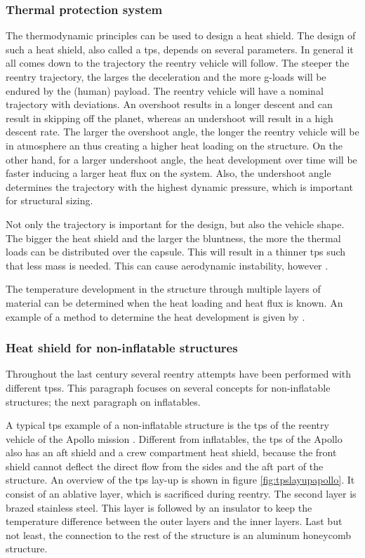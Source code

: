 \subsubsection{Thermal protection system}
The thermodynamic principles can be used to design a heat shield. The design of such a heat shield, also called a \acrfull{tps}, depends on several parameters. In general it all comes down to the trajectory the reentry vehicle will follow. The steeper the reentry trajectory, the larges the deceleration and the more g-loads will be endured by the (human) payload. The reentry vehicle will have a nominal trajectory with deviations. An overshoot results in a longer descent and can result in skipping off the planet, whereas an undershoot will result in a high descent rate. The larger the overshoot angle, the longer the reentry vehicle will be in atmosphere an thus creating a higher heat loading on the structure. On the other hand, for a larger undershoot angle, the heat development over time will be faster inducing a larger heat flux on the system. Also, the undershoot angle determines the trajectory with the highest dynamic pressure, which is important for structural sizing. 

Not only the trajectory is important for the design, but also the vehicle shape. The bigger the heat shield and the larger the bluntness, the more the thermal loads can be distributed over the capsule. This will result in a thinner \gls{tps} such that less mass is needed. This can cause aerodynamic instability, however \cite{Smoot}.

The temperature development in the structure through multiple layers of material can be determined when the heat loading and heat flux is known. An example of a method to determine the heat development is given by \cite{Hollis}.

\subsubsection*{Heat shield for non-inflatable structures}

Throughout the last century several reentry attempts have been performed with different \gls{tps}s. This paragraph focuses on several concepts for non-inflatable structures; the next paragraph on inflatables. 

A typical \gls{tps} example of a non-inflatable structure is the \gls{tps} of the reentry vehicle of the Apollo mission \cite{Pavlosky1974}. Different from inflatables, the \gls{tps} of the Apollo also has an aft shield and a crew compartment heat shield, because the front shield cannot deflect the direct flow from the sides and the aft part of the structure. An overview of the \gls{tps} lay-up is shown in figure \ref{fig:tpslayupapollo}. It consist of an ablative layer, which is sacrificed during reentry. The second layer is brazed stainless steel. This layer is followed by an insulator to keep the temperature difference between the outer layers and the inner layers. Last but not least, the connection to the rest of the structure is an aluminum honeycomb structure.

